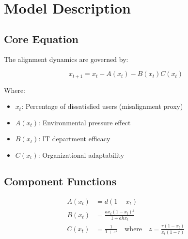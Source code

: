 \documentclass[a4paper, 10pt]{article}
\begin{document}
\clearpage
\section{Model Description}
\subsection{Core Equation}
The alignment dynamics are governed by:

\begin{equation}
	x_{t + 1} = x_t + A(x_t) - B(x_t)C(x_t)
\end{equation}

Where:
\begin{itemize}
	\item $x_t$: Percentage of dissatisfied users (misalignment proxy)
	\item $A(x_t)$: Environmental pressure effect
	\item $B(x_t)$: IT department efficacy
	\item $C(x_t)$: Organizational adaptability
\end{itemize}

\subsection{Component Functions}
\begin{align}
	A(x_t) & = d(1 - x_t)                                                                     \\
	B(x_t) & = \frac{a x_t (1 - x_t)^g}{1 + a h x_t}                                          \\
	C(x_t) & = \frac{1}{1 + z^s} \quad \text{where} \quad z = \frac{r (1 - x_t)}{x_t (1 - r)}
\end{align}
\end{document}
